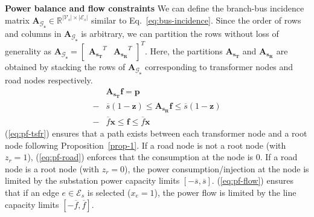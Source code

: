 \documentclass[sigconf]{acmart}
\begin{document}
\noindent\textbf{Power balance and flow constraints}
We can define the branch-bus incidence matrix $\mathbf{A_{\mathcal{G}_s}}\in\mathbb{R}^{|\mathcal{V}_s|\times|\mathcal{E}_s|}$ similar to Eq.~\ref{eq:bus-incidence}. Since the order of rows and columns in $\mathbf{A_{\mathcal{G}_s}}$ is arbitrary, we can partition the rows without loss of generality as $\mathbf{A_{\mathcal{G}_s}}=\begin{bmatrix}\mathbf{A_{s_T}}^T&\mathbf{A_{s_R}}^T\end{bmatrix}^T$. Here, the partitions $\mathbf{A_{s_T}}$ and $\mathbf{A_{s_R}}$ are obtained by stacking the rows of $\mathbf{A_{\mathcal{G}_s}}$ corresponding to transformer nodes and road nodes respectively.
\begin{subequations}
	\begin{align}
	&\mathbf{A_{s_T}}\mathbf{f}=\mathbf{p}\label{eq:pf-tsfr}\\
	-&\overline{s}(1-\mathbf{z})\leq\mathbf{A_{s_R}}\mathbf{f}\leq\overline{s}(1-\mathbf{z})\label{eq:pf-road}\\
	-&\overline{f}\mathbf{x}\leq \mathbf{f}\leq \overline{f}\mathbf{x}\label{eq:pf-flow}
	\end{align}
	\label{eq:prim-pf}
\end{subequations}
(\ref{eq:pf-tsfr}) ensures that a path exists between each transformer node and a root node following Proposition~\ref{prop-1}. If a road node is not a root node (with $z_r=1$), (\ref{eq:pf-road}) enforces that the consumption at the node is $0$. If a road node is a root node (with $z_r=0$), the power consumption/injection at the node is limited by the substation power capacity limits $[-\overline{s},\overline{s}]$. (\ref{eq:pf-flow}) ensures that if an edge $e\in\mathcal{E}_s$ is selected ($x_e=1$), the power flow is limited by the line capacity limits $[-\overline{f},\overline{f}]$.
\end{document}
